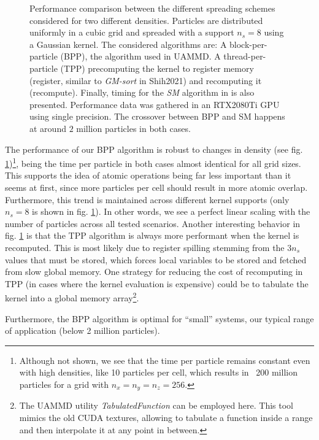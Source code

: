 \documentclass[ twoside,openright,titlepage,numbers=noenddot,%
headinclude,footinclude,cleardoublepage=empty,abstract=on,
BCOR=5mm,paper=a4,fontsize=11pt, dvipsnames
]{scrreprt}
\newcommand{\uammd}{\gls{UAMMD}\xspace}
\newcommand{\gpu}{\gls{GPU}\xspace}
\begin{document}
\begin{figure}[h]
  \centering
\caption{Performance comparison between the different spreading schemes considered for two different densities. Particles are distributed uniformly in a cubic grid and spreaded with a support $n_s=8$ using a Gaussian kernel. The considered algorithms are: A block-per-particle (BPP), the algorithm used in \uammd. A thread-per-particle (TPP) precomputing the kernel to register memory (register, similar to \emph{GM-sort} in Shih2021\cite{Shih2021}) and recomputing it (recompute). Finally, timing for the \emph{SM} algorithm in \cite{Shih2021} is also presented. Performance data was gathered in an RTX2080Ti \gpu using single precision. The crossover between BPP and SM happens at around $2$ million particles in both cases.}
  \label{fig:ibmcomp}  
\end{figure}

The performance of our BPP algorithm is robust to changes in density (see fig. \ref{fig:ibmcomp})\footnote{Although not shown, we see that the time per particle remains constant even with high densities, like 10 particles per cell, which results in ~200 million particles for a grid with $n_x=n_y=n_z=256$.}, being the time per particle in both cases almost identical for all grid sizes. This supports the idea of atomic operations being far less important than it seems at first, since more particles per cell should result in more atomic overlap. Furthermore, this trend is maintained across different kernel supports (only $n_s=8$ is shown in fig. \ref{fig:ibmcomp}). In other words, we see a perfect linear scaling with the number of particles across all tested scenarios.
Another interesting behavior in fig. \ref{fig:ibmcomp} is that the TPP algorithm is always more performant when the kernel is recomputed. This is most likely due to register spilling stemming from the $3n_s$ values that must be stored, which forces local variables to be stored and fetched from slow global memory. One strategy for reducing the cost of recomputing in TPP (in cases where the kernel evaluation is expensive) could be to tabulate the kernel into a global memory array\footnote{The \uammd utility \emph{TabulatedFunction} can be employed here. This tool mimics the old CUDA textures, allowing to tabulate a function inside a range and then interpolate it at any point in between.}.

Furthermore, the BPP algorithm is optimal for ``small'' systems, our typical range of application (below 2 million particles).
\end{document}

